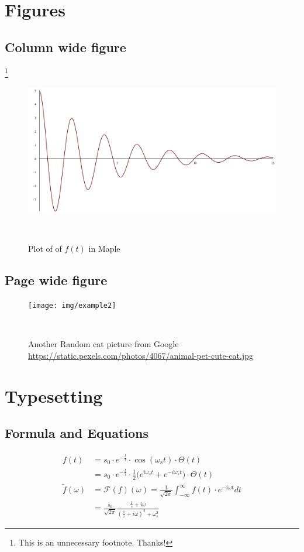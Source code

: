 
\section{Figures}
\subsection{Column wide figure}
\lipsum[1]
\lipsum*[2]\footnote{This is an unnecessary footnote. Thanks!}

\begin{figure}[h]
  \centering
  \includegraphics[width=\linewidth]{img/plot}
  \caption{Plot of of $ f(t) $ in Maple}~\label{img:function}
\end{figure}

\lipsum[3]
\lipsum[4]

\subsection{Page wide figure}
\lipsum[5]

\begin{figure}[ht]
  \centering
  \texttt{[image: img/example2]}
  \caption{Another Random cat picture from Google \protect\url{https://static.pexels.com/photos/4067/animal-pet-cute-cat.jpg}}~\label{img:cat2}
\end{figure}

\section{Typesetting}
\lipsum[6]

\subsection{Formula and Equations}
\begin{align}
    f(t) &= s_0 \cdot e^{-\frac{t}{\tau}} \cdot \cos(\omega_s t) \cdot \Theta(t) \nonumber \\
    &= s_0 \cdot e^{-\frac{t}{\tau}} \cdot \frac{1}{2} \Big( e^{i \omega_s t} + e^{-i \omega_s t} \Big) \cdot \Theta(t)\\
    \tilde{f}(\omega) &= \mathcal{F}(f)(\omega) = \frac{1}{\sqrt{2\pi}} \int_{-\infty}^{\infty} f(t) \cdot e^{-i \omega t} dt \nonumber \\
    &= \frac{s_0}{\sqrt{2\pi}} \frac{\frac{1}{\tau} + i \omega}{ {( \frac{1}{\tau} + i \omega )}^2 + \omega_s^2}
\end{align}

